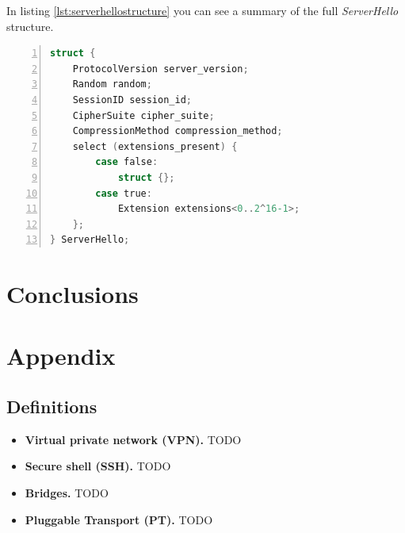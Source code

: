 \documentclass[sigconf, screen]{acmart}
\begin{document}
In listing \ref{lst:serverhellostructure} you can see a summary of the full \textit{ServerHello} structure.
\begin{lstlisting}[language=C,  tabsize=4, numbers=left, xleftmargin=5.0ex, basicstyle=\footnotesize, breakatwhitespace=false, breaklines=true, frame=tb, caption=\textit{ServerHello} structure \cite{TLS_v1_2}., label=lst:serverhellostructure]
struct {
	ProtocolVersion server_version;
	Random random;
    SessionID session_id;
    CipherSuite cipher_suite;
    CompressionMethod compression_method;
    select (extensions_present) {
    	case false:
    		struct {};
    	case true:
        	Extension extensions<0..2^16-1>;
	};
} ServerHello;
\end{lstlisting}
\section{Conclusions}
\label{s:conclusions}
\appendix
\section{Appendix}
\label{s:appendix}

\subsection{Definitions}
\label{ss:definitions}
\begin{itemize}
	\item \textbf{Virtual private network (VPN).} TODO		%
	\item \textbf{Secure shell (SSH).} TODO 				%
	\item \textbf{Bridges.}	TODO 							%
	\item \textbf{Pluggable Transport (PT).} TODO 			%
\end{itemize}


\end{document}
